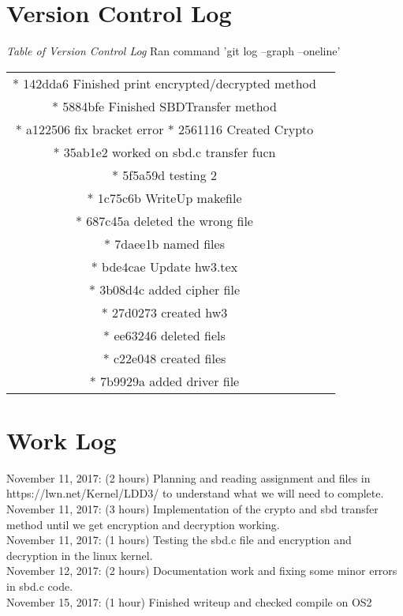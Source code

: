 \documentclass{article}
\begin{document}
\section*{Version Control Log}
\textit{Table of Version Control Log} Ran command 'git log --graph --oneline'
\newline
\begin{center}
\begin{tabular}{ c c }
* 142dda6 Finished print encrypted/decrypted method \\
* 5884bfe Finished SBDTransfer method \\
* a122506 fix bracket error
* 2561116 Created Crypto \\
* 35ab1e2 worked on sbd.c transfer fucn \\
* 5f5a59d testing 2 \\
* 1c75c6b WriteUp makefile \\
* 687c45a deleted the wrong file \\
* 7daee1b named files \\
* bde4cae Update hw3.tex \\
* 3b08d4c added cipher file  \\
* 27d0273 created hw3 \\
* ee63246 deleted fiels \\
* c22e048 created files \\
* 7b9929a added driver file
\end{tabular}
\end{center}

\section*{Work Log}
November 11, 2017: (2 hours) Planning and reading assignment and files in https://lwn.net/Kernel/LDD3/
to understand what we will need to complete. \\
November 11, 2017: (3 hours) Implementation of the crypto and sbd transfer method
until we get encryption and decryption working. \\
November 11, 2017: (1 hours) Testing the sbd.c file and encryption and decryption in
the linux kernel. \\
November 12, 2017: (2 hours) Documentation work and fixing some minor errors in
sbd.c code. \\
November 15, 2017: (1 hour) Finished writeup and checked compile on OS2
\end{document}
